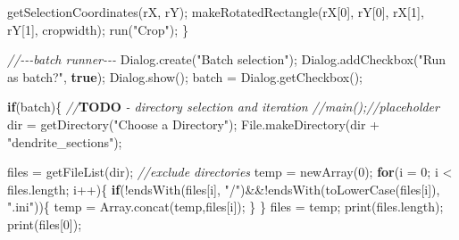 \documentclass[
  12pt,
  a4paper,
]{book}
\newenvironment{Shaded}{}{}
\newcommand{\AlertTok}[1]{\textcolor[rgb]{1.00,0.00,0.00}{\textbf{#1}}}
\newcommand{\CommentTok}[1]{\textcolor[rgb]{0.38,0.63,0.69}{\textit{#1}}}
\newcommand{\ControlFlowTok}[1]{\textcolor[rgb]{0.00,0.44,0.13}{\textbf{#1}}}
\newcommand{\DecValTok}[1]{\textcolor[rgb]{0.25,0.63,0.44}{#1}}
\newcommand{\KeywordTok}[1]{\textcolor[rgb]{0.00,0.44,0.13}{\textbf{#1}}}
\newcommand{\NormalTok}[1]{#1}
\newcommand{\OperatorTok}[1]{\textcolor[rgb]{0.40,0.40,0.40}{#1}}
\newcommand{\StringTok}[1]{\textcolor[rgb]{0.25,0.44,0.63}{#1}}
\begin{document}
\begin{Shaded}
\begin{Highlighting}[]
\NormalTok{    getSelectionCoordinates}\OperatorTok{(}\NormalTok{rX}\OperatorTok{,}\NormalTok{ rY}\OperatorTok{);}
\NormalTok{    makeRotatedRectangle}\OperatorTok{(}\NormalTok{rX}\OperatorTok{[}\DecValTok{0}\OperatorTok{],}\NormalTok{ rY}\OperatorTok{[}\DecValTok{0}\OperatorTok{],}\NormalTok{ rX}\OperatorTok{[}\DecValTok{1}\OperatorTok{],}\NormalTok{ rY}\OperatorTok{[}\DecValTok{1}\OperatorTok{],}\NormalTok{ cropwidth}\OperatorTok{);}
\NormalTok{    run}\OperatorTok{(}\StringTok{"Crop"}\OperatorTok{);}
\OperatorTok{\}}

\CommentTok{//{-}{-}{-}batch runner{-}{-}{-}}
\NormalTok{Dialog}\OperatorTok{.}\NormalTok{create}\OperatorTok{(}\StringTok{"Batch selection"}\OperatorTok{);}
\NormalTok{Dialog}\OperatorTok{.}\NormalTok{addCheckbox}\OperatorTok{(}\StringTok{"Run as batch?"}\OperatorTok{,} \KeywordTok{true}\OperatorTok{);}
\NormalTok{Dialog}\OperatorTok{.}\NormalTok{show}\OperatorTok{();}
\NormalTok{batch }\OperatorTok{=}\NormalTok{ Dialog}\OperatorTok{.}\NormalTok{getCheckbox}\OperatorTok{();}

\ControlFlowTok{if}\OperatorTok{(}\NormalTok{batch}\OperatorTok{)\{}
    \CommentTok{//}\AlertTok{TODO}\CommentTok{ {-} directory selection and iteration}
    \CommentTok{//main();//placeholder}
\NormalTok{    dir }\OperatorTok{=}\NormalTok{ getDirectory}\OperatorTok{(}\StringTok{"Choose a Directory"}\OperatorTok{);}
\NormalTok{    File}\OperatorTok{.}\NormalTok{makeDirectory}\OperatorTok{(}\NormalTok{dir }\OperatorTok{+} \StringTok{"dendrite\_sections"}\OperatorTok{);}
    
\NormalTok{    files }\OperatorTok{=}\NormalTok{ getFileList}\OperatorTok{(}\NormalTok{dir}\OperatorTok{);}
    \CommentTok{//exclude directories}
\NormalTok{    temp }\OperatorTok{=}\NormalTok{ newArray}\OperatorTok{(}\DecValTok{0}\OperatorTok{);}
    \ControlFlowTok{for}\OperatorTok{(}\NormalTok{i }\OperatorTok{=} \DecValTok{0}\OperatorTok{;}\NormalTok{ i }\OperatorTok{\textless{}}\NormalTok{ files}\OperatorTok{.}\NormalTok{length}\OperatorTok{;}\NormalTok{ i}\OperatorTok{++)\{}
        \ControlFlowTok{if}\OperatorTok{(!}\NormalTok{endsWith}\OperatorTok{(}\NormalTok{files}\OperatorTok{[}\NormalTok{i}\OperatorTok{],} \StringTok{"/"}\OperatorTok{)\&\&!}\NormalTok{endsWith}\OperatorTok{(}\NormalTok{toLowerCase}\OperatorTok{(}\NormalTok{files}\OperatorTok{[}\NormalTok{i}\OperatorTok{]),} \StringTok{".ini"}\OperatorTok{))\{}
\NormalTok{            temp }\OperatorTok{=}\NormalTok{ Array}\OperatorTok{.}\NormalTok{concat}\OperatorTok{(}\NormalTok{temp}\OperatorTok{,}\NormalTok{files}\OperatorTok{[}\NormalTok{i}\OperatorTok{]);}
        \OperatorTok{\}}
    \OperatorTok{\}}
\NormalTok{    files }\OperatorTok{=}\NormalTok{ temp}\OperatorTok{;}
\NormalTok{    print}\OperatorTok{(}\NormalTok{files}\OperatorTok{.}\NormalTok{length}\OperatorTok{);}
\NormalTok{    print}\OperatorTok{(}\NormalTok{files}\OperatorTok{[}\DecValTok{0}\OperatorTok{]);}
        

\end{Highlighting}
\end{Shaded}
\end{document}
